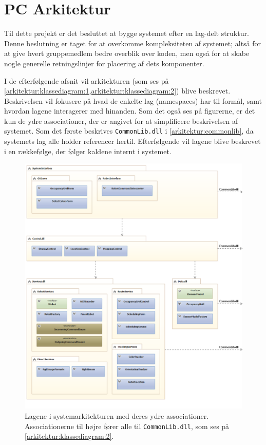 \label{arkitektur}
\section{PC Arkitektur}
Til dette projekt er det besluttet at bygge systemet efter en lag-delt struktur.
Denne beslutning er taget for at overkomme kompleksiteten af systemet; altså for at give hvert gruppemedlem bedre overblik over koden, men også for at skabe nogle generelle retningslinjer for placering af dets komponenter.

I de efterfølgende afsnit vil arkitekturen (som ses på  \cref{arkitektur:klassediagram:1,arkitektur:klassediagram:2}) blive beskrevet.
Beskrivelsen vil fokusere på hvad de enkelte lag (namespaces) har til formål, samt hvordan lagene interagerer med hinanden.
Som det også ses på figurerne, er det kun de ydre associationer, der er angivet for at simplificere beskrivelsen af systemet.
Som det første beskrives \lstinline[style=csharp]!CommonLib.dll! i \cref{arkitektur:commonlib}, da systemets lag alle holder referencer hertil.
Efterfølgende vil lagene blive beskrevet i en rækkefølge, der følger kaldene internt i systemet.
\begin{figure}
\centering
\includegraphics[width=1\textwidth]{./graphics/systemarkitektur_1}
\caption{Lagene i systemarkitekturen med deres ydre associationer. Associationerne til højre fører alle til \lstinline[style=csharp]!CommonLib.dll!, som ses på \cref{arkitektur:klassediagram:2}.}
\label{arkitektur:klassediagram:1}
\end{figure}

